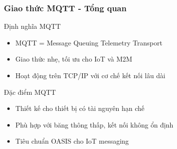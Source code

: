 \begin{frame}
\frametitle{Giao thức MQTT - Tổng quan}

\begin{block}{Định nghĩa MQTT}
\begin{itemize}
\item MQTT = Message Queuing Telemetry Transport
\item Giao thức nhẹ, tối ưu cho IoT và M2M
\item Hoạt động trên TCP/IP với cơ chế kết nối lâu dài
\end{itemize}
\end{block}

\begin{block}{Đặc điểm MQTT}
\begin{itemize}
\item Thiết kế cho thiết bị có tài nguyên hạn chế
\item Phù hợp với băng thông thấp, kết nối không ổn định
\item Tiêu chuẩn OASIS cho IoT messaging
\end{itemize}
\end{block}

\end{frame}


